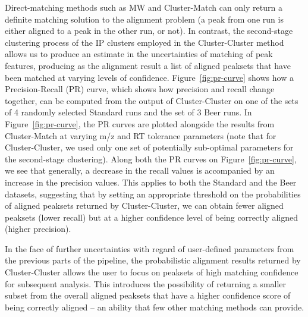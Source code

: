 Direct-matching methods such as MW and Cluster-Match can only return a definite matching solution to the alignment problem (a peak from one run is either aligned to a peak in the other run, or not). In contrast, the second-stage clustering process of the IP clusters employed in the Cluster-Cluster method allows us to produce an estimate in the uncertainties of matching of peak features, producing as the alignment result a list of aligned peaksets that have been matched at varying levels of confidence. Figure~\ref{fig:pr-curve} shows how a Precision-Recall (PR) curve, which shows how precision and recall change together, can be computed from the output of Cluster-Cluster on one of the sets of 4 randomly selected Standard runs and the set of 3 Beer runs. In Figure~\ref{fig:pr-curve}, the PR curves are plotted alongside the results from Cluster-Match at varying m/z and RT tolerance parameters (note that for Cluster-Cluster, we used only one set of potentially sub-optimal parameters for the second-stage clustering). Along both the PR curves on Figure~\ref{fig:pr-curve}, we see that generally, a decrease in the recall values is accompanied by an increase in the precision values. This applies to both the Standard and the Beer datasets, suggesting that by setting an appropriate threshold on the probabilities of aligned peaksets returned by Cluster-Cluster, we can obtain fewer aligned peaksets (lower recall) but at a higher confidence level of being correctly aligned (higher precision).

In the face of further uncertainties with regard of user-defined parameters from the previous parts of the pipeline, the probabilistic alignment results returned by Cluster-Cluster allows the user to focus on peaksets of high matching confidence for subsequent analysis.  This introduces the possibility of returning a smaller subset from the overall aligned peaksets that have a higher confidence score of being correctly aligned -- an ability that few other matching methods can provide.

